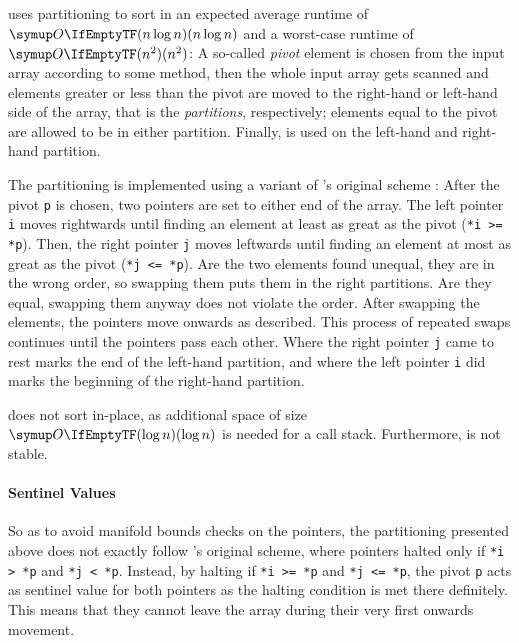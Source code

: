 \section{\texorpdfstring{\QS{}}{QuickSort}}
\label{sec:tasklet:quick}

\QS{} \cites{hoare1962quicksort}[88-91]{maurer1974datenstrukturen}[Chapter~2.2.6]{wirth1975algorithmen} uses partitioning to sort in an expected average runtime of \(\bigoh{n \log n}\) and a worst-case runtime of \(\bigoh{n^2}\):
A so-called \emph{pivot} element is chosen from the input array according to some method, then the whole input array gets scanned and elements greater or less than the pivot are moved to the right-hand or left-hand side of the array, that is the \emph{partitions}, respectively;
elements equal to the pivot are allowed to be in either partition.
Finally, \QS{} is used on the left-hand and right-hand partition.

The partitioning is implemented using a variant of \citeauthor{hoare1962quicksort}'s original scheme \cite{hoare1962quicksort}:
After the pivot \lstinline|p| is chosen, two pointers are set to either end of the array.
The left pointer \lstinline|i| moves rightwards until finding an element at least as great as the pivot (\lstinline|*i >= *p|).
Then, the right pointer \lstinline|j| moves leftwards until finding an element at most as great as the pivot (\lstinline|*j <= *p|).
Are the two elements found unequal, they are in the wrong order, so swapping them puts them in the right partitions.
Are they equal, swapping them anyway does not violate the order.
After swapping the elements, the pointers move onwards as described.
This process of repeated swaps continues until the pointers pass each other.
Where the right pointer \lstinline|j| came to rest marks the end of the left-hand partition, and where the left pointer \lstinline|i| did marks the beginning of the right-hand partition.

\QS{} does not sort in-place, as additional space of size \(\bigoh{\log n}\) is needed for a call stack.
Furthermore, \QS{} is not stable.


\paragraph{Sentinel Values}
\label{sec:tasklet:quick:imp:sentinels}
So as to avoid manifold bounds checks on the pointers, the partitioning presented above does not exactly follow \citeauthor{hoare1962quicksort}'s original scheme, where pointers halted only if \lstinline|*i > *p| and \lstinline|*j < *p|.
Instead, by halting if \lstinline|*i >= *p| and \lstinline|*j <= *p|, the pivot \lstinline|p| acts as sentinel value for both pointers as the halting condition is met there definitely.
This means that they cannot leave the array during their very first onwards movement.

